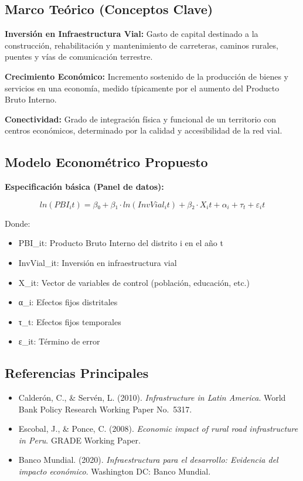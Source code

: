 \documentclass[
  man,
  floatsintext,
  longtable,
  a4paper,
  nolmodern,
  notxfonts,
  notimes,
  12pt,
  colorlinks=true,linkcolor=blue,citecolor=blue,urlcolor=blue]{apa7}
\providecommand{\tightlist}{%
  \setlength{\itemsep}{0pt}\setlength{\parskip}{0pt}}
\begin{document}
\subsection{Marco Teórico (Conceptos
Clave)}\label{marco-teuxf3rico-conceptos-clave-3}

\textbf{Inversión en Infraestructura Vial:} Gasto de capital destinado a
la construcción, rehabilitación y mantenimiento de carreteras, caminos
rurales, puentes y vías de comunicación terrestre.

\textbf{Crecimiento Económico:} Incremento sostenido de la producción de
bienes y servicios en una economía, medido típicamente por el aumento
del Producto Bruto Interno.

\textbf{Conectividad:} Grado de integración física y funcional de un
territorio con centros económicos, determinado por la calidad y
accesibilidad de la red vial.

\subsection{Modelo Econométrico
Propuesto}\label{modelo-economuxe9trico-propuesto}

\textbf{Especificación básica (Panel de datos):}

\[
ln(PBI_it) = β₀ + β₁·ln(InvVial_it) + β₂·X_it + α_i + τ_t + ε_it
\]

Donde:

\begin{itemize}
\tightlist
\item
  PBI\_it: Producto Bruto Interno del distrito i en el año t
\item
  InvVial\_it: Inversión en infraestructura vial
\item
  X\_it: Vector de variables de control (población, educación, etc.)
\item
  α\_i: Efectos fijos distritales
\item
  τ\_t: Efectos fijos temporales
\item
  ε\_it: Término de error
\end{itemize}

\subsection{Referencias Principales}\label{referencias-principales-3}

\begin{itemize}
\tightlist
\item
  Calderón, C., \& Servén, L. (2010). \emph{Infrastructure in Latin
  America}. World Bank Policy Research Working Paper No.~5317.
\item
  Escobal, J., \& Ponce, C. (2008). \emph{Economic impact of rural road
  infrastructure in Peru}. GRADE Working Paper.
\item
  Banco Mundial. (2020). \emph{Infraestructura para el desarrollo:
  Evidencia del impacto económico}. Washington DC: Banco Mundial.
\end{itemize}
\end{document}
